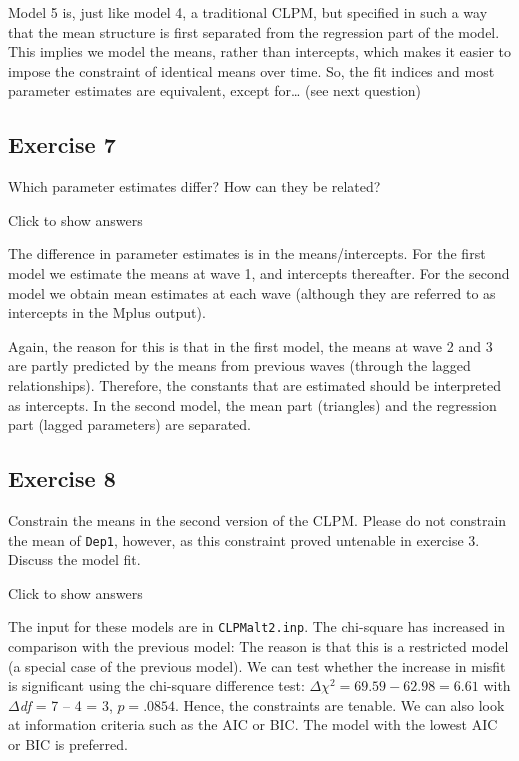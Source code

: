 \documentclass[
]{book}
\begin{document}
Model 5 is, just like model 4, a traditional CLPM, but specified in such a way that the mean structure is first separated from the regression part of the model. This implies we model the means, rather than intercepts, which makes it easier to impose the constraint of identical means over time. So, the fit indices and most parameter estimates are equivalent, except for\ldots{} (see next question)

\hypertarget{exercise-7}{%
\subsection{Exercise 7}\label{exercise-7}}

Which parameter estimates differ? How can they be related?

Click to show answers

The difference in parameter estimates is in the means/intercepts. For the first model we estimate the means at wave 1, and intercepts thereafter. For the second model we obtain mean estimates at each wave (although they are referred to as intercepts in the Mplus output).

Again, the reason for this is that in the first model, the means at wave 2 and 3 are partly predicted by the means from previous waves (through the lagged relationships). Therefore, the constants that are estimated should be interpreted as intercepts. In the second model, the mean part (triangles) and the regression part (lagged parameters) are separated.

\hypertarget{exercise-8}{%
\subsection{Exercise 8}\label{exercise-8}}

Constrain the means in the second version of the CLPM. Please do not constrain the mean of \texttt{Dep1}, however, as this constraint proved untenable in exercise 3. Discuss the model fit.

Click to show answers

The input for these models are in \texttt{CLPMalt2.inp}. The chi-square has increased in comparison with the previous model: The reason is that this is a restricted model (a special case of the previous model). We can test whether the increase in misfit is significant using the chi-square difference test: \(\Delta\chi^{2} = 69.59 - 62.98 = 6.61\) with \(\Delta\)\emph{df} = 7 -- 4 = 3, \(p = .0854\). Hence, the constraints are tenable. We can also look at information criteria such as the AIC or BIC. The model with the lowest AIC or BIC is preferred.
\end{document}
